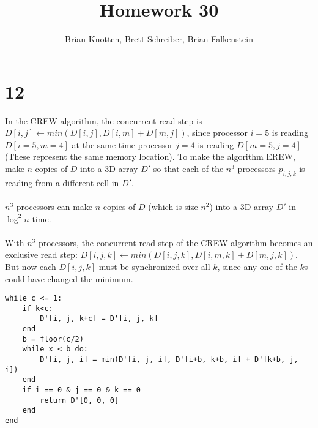 \documentclass[letterpaper,notitlepage,twoside]{article}
\begin{document}
\title{Homework 30}
\author{Brian Knotten, Brett Schreiber, Brian Falkenstein}
\maketitle

\section*{12}
In the CREW algorithm, the concurrent read step is $D[i,j] \gets min(D[i, j], D[i, m] + D[m, j])$, since processor $i = 5$ is reading $D[i = 5, m = 4]$ at the same time processor $j = 4$ is reading $D[m = 5, j = 4]$ (These represent the same memory location). To make the algorithm EREW, make $n$ copies of $D$ into a 3D array $D'$ so that each of the $n^3$ processors $p_{i, j, k}$ is reading from a different cell in $D'$.
\\\\
$n^3$ processors can make $n$ copies of $D$ (which is size $n^2$) into a 3D array $D'$ in $\log^2 n$ time.
\\\\
With $n^3$ processors, the concurrent read step of the CREW algorithm becomes an exclusive read step: $D[i, j, k] \gets min(D[i, j, k], D[i, m, k] + D[m, j, k])$. But now each $D[i, j, k]$ must be synchronized over all $k$, since any one of the $k$s could have changed the minimum. 
\begin{verbatim}
while c <= 1:
	if k<c:
		D'[i, j, k+c] = D'[i, j, k]
	end
	b = floor(c/2)
	while x < b do:
		D'[i, j, i] = min(D'[i, j, i], D'[i+b, k+b, i] + D'[k+b, j, i])
	end
	if i == 0 & j == 0 & k == 0
		return D'[0, 0, 0]
	end
end
\end{verbatim}
\end{document}
